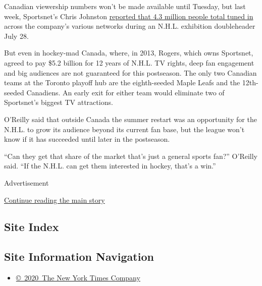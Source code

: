Canadian viewership numbers won't be made available until Tuesday, but
last week, Sportsnet's Chris Johnston
\href{https://twitter.com/SportsnetPR/status/1288572556887429120}{reported
that 4.3 million people total tuned in} across the company's various
networks during an N.H.L. exhibition doubleheader July 28.

But even in hockey-mad Canada, where, in 2013, Rogers, which owns
Sportsnet, agreed to pay \$5.2 billion for 12 years of N.H.L. TV rights,
deep fan engagement and big audiences are not guaranteed for this
postseason. The only two Canadian teams at the Toronto playoff hub are
the eighth-seeded Maple Leafs and the 12th-seeded Canadiens. An early
exit for either team would eliminate two of Sportsnet's biggest TV
attractions.

O'Reilly said that outside Canada the summer restart was an opportunity
for the N.H.L. to grow its audience beyond its current fan base, but the
league won't know if it has succeeded until later in the postseason.

``Can they get that share of the market that's just a general sports
fan?'' O'Reilly said. ``If the N.H.L. can get them interested in hockey,
that's a win.''

Advertisement

\protect\hyperlink{after-bottom}{Continue reading the main story}

\hypertarget{site-index}{%
\subsection{Site Index}\label{site-index}}

\hypertarget{site-information-navigation}{%
\subsection{Site Information
Navigation}\label{site-information-navigation}}

\begin{itemize}
\tightlist
\item
  \href{https://help.nytimes3xbfgragh.onion/hc/en-us/articles/115014792127-Copyright-notice}{©~2020~The
  New York Times Company}
\end{itemize}

